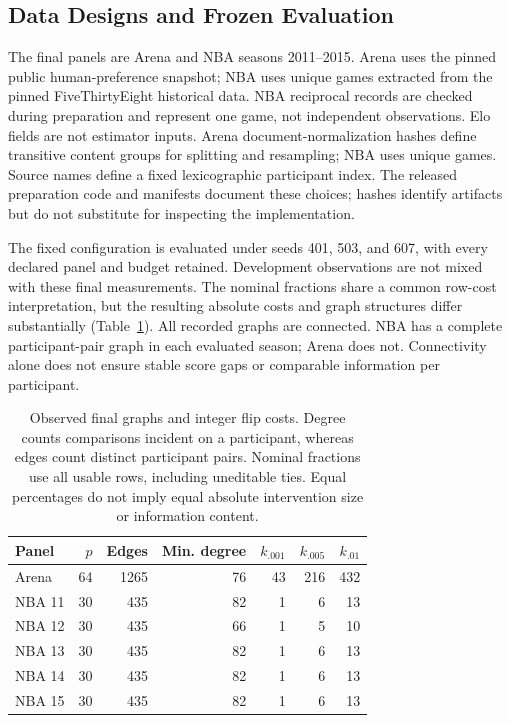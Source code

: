 \documentclass{article}
\begin{document}
\subsection{Data Designs and Frozen Evaluation}
The final panels are Arena and NBA seasons 2011--2015. Arena uses the pinned public human-preference snapshot; NBA uses unique games extracted from the pinned FiveThirtyEight historical data. NBA reciprocal records are checked during preparation and represent one game, not independent observations. Elo fields are not estimator inputs. Arena document-normalization hashes define transitive content groups for splitting and resampling; NBA uses unique games. Source names define a fixed lexicographic participant index. The released preparation code and manifests document these choices; hashes identify artifacts but do not substitute for inspecting the implementation.

The fixed configuration is evaluated under seeds 401, 503, and 607, with every declared panel and budget retained. Development observations are not mixed with these final measurements. The nominal fractions share a common row-cost interpretation, but the resulting absolute costs and graph structures differ substantially (Table~\ref{tab:panels}). All recorded graphs are connected. NBA has a complete participant-pair graph in each evaluated season; Arena does not. Connectivity alone does not ensure stable score gaps or comparable information per participant.

\begin{table}[t]
\centering
\caption{Observed final graphs and integer flip costs. Degree counts comparisons incident on a participant, whereas edges count distinct participant pairs. Nominal fractions use all usable rows, including uneditable ties. Equal percentages do not imply equal absolute intervention size or information content.}
\label{tab:panels}
\begin{tabular}{lrrrrrr}
\toprule
Panel & $p$ & Edges & Min. degree & $k_{.001}$ & $k_{.005}$ & $k_{.01}$\\
\midrule
Arena & 64 & 1265 & 76 & 43 & 216 & 432\\
NBA 11 & 30 & 435 & 82 & 1 & 6 & 13\\
NBA 12 & 30 & 435 & 66 & 1 & 5 & 10\\
NBA 13 & 30 & 435 & 82 & 1 & 6 & 13\\
NBA 14 & 30 & 435 & 82 & 1 & 6 & 13\\
NBA 15 & 30 & 435 & 82 & 1 & 6 & 13\\
\bottomrule
\end{tabular}
\end{table}
\end{document}
